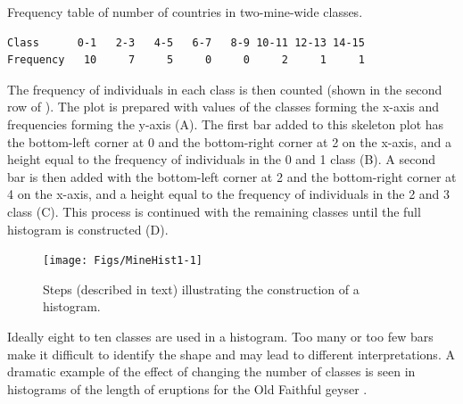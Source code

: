 \documentclass[10pt,openany]{book}\usepackage[]{graphicx}\usepackage[]{color}
\newenvironment{knitrout}{}{} %
\begin{document}
\vspace{-6pt}
\begin{table}[htbp]
  \caption{Frequency table of number of countries in two-mine-wide classes.}
  \label{tab:MineFreqTable}
    \begin{Verbatim}[xleftmargin=25mm]
Class      0-1   2-3   4-5   6-7   8-9 10-11 12-13 14-15
Frequency   10     7     5     0     0     2     1     1
    \end{Verbatim}
\end{table}
\vspace{-12pt}

The frequency of individuals in each class is then counted (shown in the second row of ). The plot is prepared with values of the classes forming the x-axis and frequencies forming the y-axis (A). The first bar added to this skeleton plot has the bottom-left corner at 0 and the bottom-right corner at 2 on the x-axis, and a height equal to the frequency of individuals in the 0 and 1 class (B). A second bar is then added with the bottom-left corner at 2 and the bottom-right corner at 4 on the x-axis, and a height equal to the frequency of individuals in the 2 and 3 class (C). This process is continued with the remaining classes until the full histogram is constructed (D).

\begin{knitrout}
\color{fgcolor}\begin{figure}[hbtp]

{\centering \texttt{[image: Figs/MineHist1-1]} 

}

\caption[Steps (described in text) illustrating the construction of a histogram]{Steps (described in text) illustrating the construction of a histogram.}\label{fig:MineHist1}
\end{figure}


\end{knitrout}

Ideally eight to ten classes are used in a histogram. Too many or too few bars make it difficult to identify the shape and may lead to different interpretations. A dramatic example of the effect of changing the number of classes is seen in histograms of the length of eruptions for the Old Faithful geyser .
\end{document}

